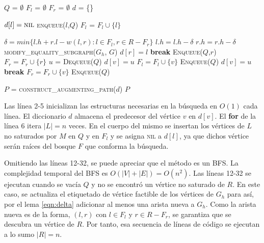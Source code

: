 \documentclass[10pt]{article} %
\begin{document}
\vspace{1em}
\begin{algorithmic}[1]
	\State $Q$ = $\emptyset$
	\State $F_l$ = $\emptyset$
	\State $F_r$ = $\emptyset$
	\State $d$ = \{\}
	
	\State $d[l] = \textsc{nil}$
	\State \textsc{enqueue($l$,$Q$)}
	\State $F_l$ = $F_l \cup \{l\}$
	
	\EndFor
	
	\Repeat
	\State $\delta = min\{l.h + r.l - w(l,r): l\in F_l, r \in R-F_r\}$ 
	\State $l.h = l.h -\delta$
	\EndFor
	\State $r.h = r.h -\delta$
	\EndFor
	\State \textsc{modify\_equality\_subgraph($G_h$, $G$)}
	\State $d[r] = l $
	\State \textbf{break}
	\Else
	\State \textsc{Enqueue($Q$,$r$)}
	\State $F_r = F_r \cup \{r\}$
	\EndIf
	\EndIf
	\EndFor
	\EndIf
	\State $u$ = \textsc{Dequeue($Q$)}
	\State $d[v] = u$
	\State $F_l = F_l \cup \{v\}$
	\State \textsc{Enqueue($Q$)}
	\EndIf
	\EndFor	
	\Else 
	\State $d[v] = u$
	\State \textbf{break}
	\Else						
	\State $F_r = F_r \cup \{v\}$
	\State \textsc{Enqueue($Q$)}
	\EndIf
	\EndIf
	
	\EndFor	
	
	\EndIf
	
	\State $P$ = \textsc{construct\_augmenting\_path($d$)}
	\State \Return $P$
	\EndFunction 
\end{algorithmic}
\vspace{1em}

Las l\'inea 2-5 inicializan las estructuras necesarias en la b\'usqueda en $O(1)$ cada l\'inea. El diccionario $d$ almacena el predecesor del v\'ertice $v$ en $d[v]$. El \textbf{for} de la l\'inea 6 itera $|L|=n$ veces. En el cuerpo del mismo se insertan los v\'ertices de $L$ no saturados por $M$ en $Q$ y en $F_l$ y se asigna \textsc{nil} a $d[l]$, ya que dichos v\'ertice ser\'an ra\'ices del bosque $F$ que conforma la b\'usqueda.

Omitiendo las l\'ineas 12-32, se puede apreciar que el m\'etodo es un BFS. La complejidad temporal del BFS es $O(|V| + |E|) = O(n^2)$. Las l\'ineas 12-32 se ejecutan cuando se vac\'ia $Q$ y no se encontr\'o un v\'ertice no saturado de $R$. En este caso, se actualiza el etiquetado de v\'ertice factible de los v\'ertices de $G_h$ para as\'i, por el lema \ref{eqn:delta} adicionar al menos una arista nueva a $G_h$. Como la arista nueva es de la forma, $(l,r)$ con $l\in F_l$ y $r \in R-F_r$, se garantiza que se descubra un v\'ertice de $R$. Por tanto, esa secuencia de l\'ineas de c\'odigo se ejecutan a lo sumo $|R|=n$.
\end{document}

